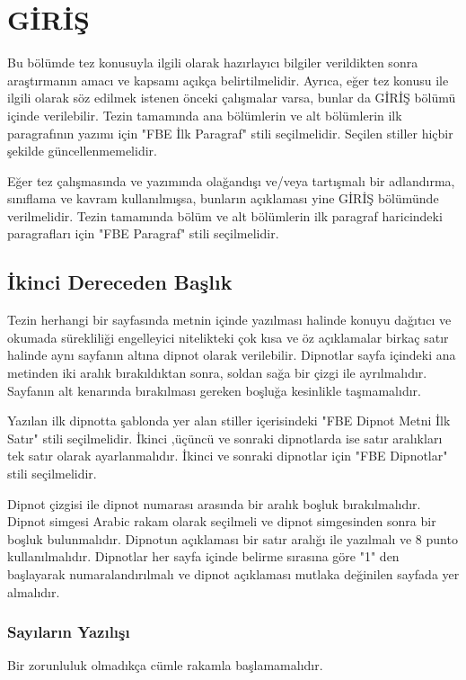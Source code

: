 
\chapter{GİRİŞ}
Bu bölümde tez konusuyla ilgili olarak hazırlayıcı bilgiler verildikten sonra araştırmanın amacı ve kapsamı açıkça belirtilmelidir. Ayrıca, eğer tez konusu ile ilgili olarak söz edilmek istenen önceki çalışmalar varsa, bunlar da GİRİŞ bölümü içinde verilebilir. Tezin tamamında ana bölümlerin ve alt bölümlerin ilk paragrafının yazımı için "FBE İlk Paragraf" stili seçilmelidir. Seçilen stiller hiçbir şekilde güncellenmemelidir.

Eğer tez çalışmasında ve yazımında olağandışı ve/veya tartışmalı bir adlandırma, sınıflama ve kavram kullanılmışsa, bunların açıklaması yine GİRİŞ bölümünde verilmelidir. Tezin tamamında bölüm ve alt bölümlerin ilk paragraf haricindeki paragrafları için "FBE Paragraf" stili seçilmelidir.

\section{İkinci Dereceden Başlık}
\noindent Tezin herhangi bir sayfasında metnin içinde yazılması halinde konuyu dağıtıcı ve okumada sürekliliği engelleyici nitelikteki çok kısa ve öz açıklamalar birkaç satır halinde aynı sayfanın altına dipnot olarak verilebilir. Dipnotlar sayfa içindeki ana metinden iki aralık bırakıldıktan sonra, soldan sağa bir çizgi ile ayrılmalıdır. Sayfanın alt kenarında bırakılması gereken boşluğa kesinlikle taşmamalıdır.

Yazılan ilk dipnotta  şablonda yer alan stiller içerisindeki "FBE Dipnot Metni İlk Satır" stili seçilmelidir. İkinci  ,üçüncü   ve sonraki dipnotlarda ise satır aralıkları tek satır olarak ayarlanmalıdır. İkinci ve sonraki dipnotlar için "FBE Dipnotlar" stili seçilmelidir.

Dipnot çizgisi ile dipnot numarası arasında bir aralık boşluk bırakılmalıdır. Dipnot simgesi Arabic rakam olarak seçilmeli ve dipnot simgesinden sonra bir boşluk bulunmalıdır. Dipnotun açıklaması bir satır aralığı ile yazılmalı ve 8 punto kullanılmalıdır. Dipnotlar her sayfa içinde belirme sırasına göre "1" den başlayarak numaralandırılmalı ve dipnot açıklaması mutlaka değinilen sayfada yer almalıdır. 

\subsection{Sayıların Yazılışı}
\noindent Bir zorunluluk olmadıkça cümle rakamla başlamamalıdır.


